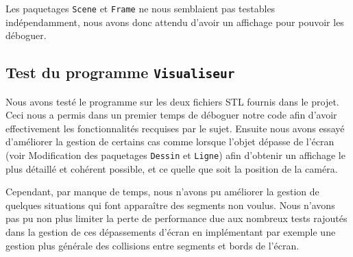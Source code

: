 \documentclass[10pt]{article}
\begin{document}
Les paquetages \lstinline!Scene! et \lstinline!Frame! ne nous semblaient pas testables indépendamment, nous avons donc attendu d'avoir un affichage pour pouvoir les déboguer.

\subsection{Test du programme \lstinline!Visualiseur!}

Nous avons testé le programme sur les deux fichiers STL fournis dans le projet. Ceci nous a permis dans un premier temps de déboguer notre code afin d'avoir effectivement les fonctionnalités recquises par le sujet. Ensuite nous avons essayé d'améliorer la gestion de certains cas comme lorsque l'objet dépasse de l'écran (voir Modification des paquetages \lstinline!Dessin! et \lstinline!Ligne!) afin d'obtenir un affichage le plus détaillé et cohérent possible, et ce quelle que soit la position de la caméra.

Cependant, par manque de temps, nous n'avons pu améliorer la gestion de quelques situations qui font apparaître des segments non voulus. Nous n'avons pas pu non plus limiter la perte de performance due aux nombreux tests rajoutés dans la gestion de ces dépassements d'écran en implémentant par exemple une gestion plus générale des collisions entre segments et bords de l'écran.

\end{document}
